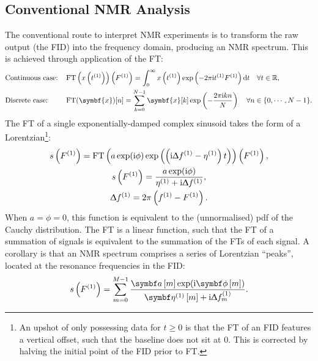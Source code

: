 \subsection{Conventional NMR Analysis}
\label{subsec:nmr-analysis}
The conventional route to interpret \ac{NMR} experiments is to
transform the raw output (the \ac{FID}) into the frequency domain, producing an
\ac{NMR} spectrum. This is achieved through application of the \acf{FT}:
\begin{subequations}
    \begin{flalign}
        &\text{Continuous case:} &&\FT\left( x\left(\tone\right) \right)\left(\Fone\right) =  \int_{0}^{\infty} x\left(\tone\right) \exp \left(
            -2 \pi \iu \tone \Fone \right) \mathrm{d} t
            \quad \forall t \in \mathbb{R},\\
        &\text{Discrete case:} &&\FT( \symbf{x} )[n] =  \sum_{k=0}^{N-1} \symbf{x}[k] \exp \left(
            -\frac{2 \pi \iu k n}{N} \right)
            \quad \forall n \in \lbrace 0, \cdots, N-1 \rbrace.
    \end{flalign}
\end{subequations}
The \ac{FT} of a single exponentially-damped complex sinusoid takes the form of
a Lorentzian\footnote{
    An upshot of only possessing data for $t \geq 0$ is
    that the \ac{FT} of an \ac{FID} features a vertical offset,
    such that the baseline does not sit at 0\cite{Tang1994}. This is corrected
    by halving the initial point of the \ac{FID} prior to \ac{FT}.
}:
\begin{subequations}
    \begin{gather}
        s\left(F^{(1)}\right) = \operatorname{FT}\left(
            a \exp(\mathrm{i} \phi) \exp\left(\left(\mathrm{i} \Updelta f^{(1)} - \eta^{(1)}\right) t\right) \right) \left(F^{(1)}\right),\\
        s\left(F^{(1)}\right) = \frac{a \exp(\mathrm{i} \phi) }
            {\eta^{(1)} + \mathrm{i} \Updelta f^{(1)}},\\
        \Updelta f^{(1)} = 2 \pi \left(f^{(1)} - F^{(1)} \right).
    \end{gather}
\end{subequations}
When $a = \phi = 0$, this function is equivalent to the (unnormalised) \ac{pdf}
of the Cauchy distribution. The \ac{FT} is a linear function, such that the
\ac{FT} of a summation of signals is equivalent to the summation of the
\acp{FT} of each signal. A corollary is that an \ac{NMR} spectrum comprises a
series of Lorentzian ``peaks'', located at the resonance frequencies in the \ac{FID}:
\begin{equation}
    s\left(\Fone\right) = \sum_{m=0}^{M-1}
    \frac{\bdam \exp(\iu \bdphim)}
    {\bdetaonem + \iu \Updelta f^{(1)}_m}.
    \label{eq:ft-summation}
\end{equation}
